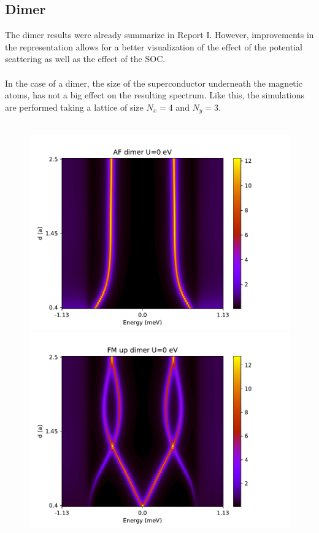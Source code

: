\documentclass[letterpaper,12pt]{article}
\begin{document}
\subsection{Dimer}
The dimer results were already summarize in Report I. However, improvements in the representation allows for a better visualization of the effect of the potential scattering as well as the effect of the SOC.\\ \\
In the case of a dimer, the size of the superconductor underneath the magnetic atoms, has not a big effect on the resulting spectrum. Like this, the simulations are performed taking a lattice of size $N_x = 4$ and $N_y = 3$.\\ \\
\begin{figure}[h!]
    \centering
    \includegraphics[scale = .5]{AF_dimer.pdf}
    \includegraphics[scale = .5]{FM_dimer.pdf}
    

\end{figure}
\end{document}
